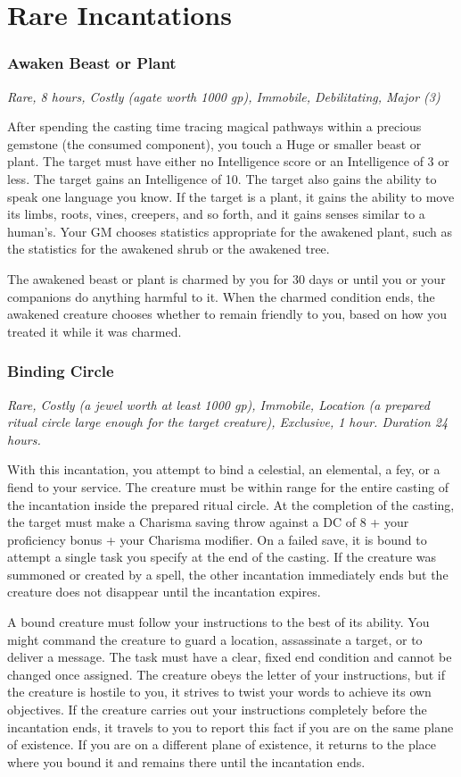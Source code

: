 \section{Rare Incantations}

\subsubsection{Awaken Beast or Plant}
\textit{Rare, 8 hours, Costly (agate worth 1000 gp), Immobile, Debilitating, Major (3)}

After spending the casting time tracing magical pathways within a precious gemstone (the consumed component), you touch a Huge or smaller beast or plant. The target must have either no Intelligence score or an Intelligence of 3 or less. The target gains an Intelligence of 10. The target also gains the ability to speak one language you know. If the target is a plant, it gains the ability to move its limbs, roots, vines, creepers, and so forth, and it gains senses similar to a human's. Your GM chooses statistics appropriate for the awakened plant, such as the statistics for the awakened shrub or the awakened tree.

The awakened beast or plant is charmed by you for 30 days or until you or your companions do anything harmful to it. When the charmed condition ends, the awakened creature chooses whether to remain friendly to you, based on how you treated it while it was charmed.

\subsubsection{Binding Circle}
\textit{Rare, Costly (a jewel worth at least 1000 gp), Immobile, Location (a prepared ritual circle large enough for the target creature), Exclusive, 1 hour. Duration 24 hours.}

With this incantation, you attempt to bind a celestial, an elemental, a fey, or a fiend to your service. The creature must be within range for the entire casting of the incantation inside the prepared ritual circle. At the completion of the casting, the target must make a Charisma saving throw against a DC of 8 + your proficiency bonus + your Charisma modifier. On a failed save, it is bound to attempt a single task you specify at the end of the casting. If the creature was summoned or created by a spell, the other incantation immediately ends but the creature does not disappear until the incantation expires.

A bound creature must follow your instructions to the best of its ability. You might command the creature to guard a location, assassinate a target, or to deliver a message. The task must have a clear, fixed end condition and cannot be changed once assigned. The creature obeys the letter of your instructions, but if the creature is hostile to you, it strives to twist your words to achieve its own objectives. If the creature carries out your instructions completely before the incantation ends, it travels to you to report this fact if you are on the same plane of existence. If you are on a different plane of existence, it returns to the place where you bound it and remains there until the incantation ends.

